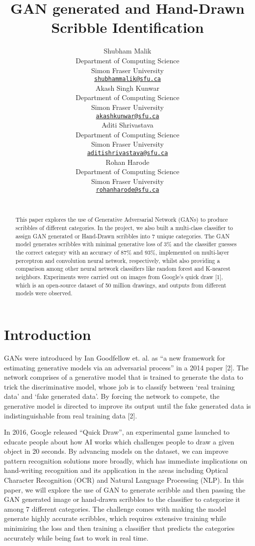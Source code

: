\documentclass{article} %
\title{GAN generated and Hand-Drawn Scribble Identification}
\author{
Shubham Malik\\
Department of Computing Science\\
Simon Fraser University\\
\href{mailto:shubhamm@sfu.ca}{\texttt{shubham\textunderscore malik@sfu.ca}} \\
\And
Akash Singh Kunwar \\
Department of Computing Science\\
Simon Fraser University\\
\href{mailto:akunwar@sfu.ca}{\texttt{akash\textunderscore kunwar@sfu.ca}} \\
\AND
Aditi Shrivastava \\
Department of Computing Science\\
Simon Fraser University\\
\href{mailto:ashrivas@sfu.ca}{\texttt{aditi\textunderscore shrivastava@sfu.ca}}
 \\
\And
Rohan Harode \\
Department of Computing Science\\
Simon Fraser University\\
\href{mailto:rharode@sfu.ca}{\texttt{rohan\textunderscore harode@sfu.ca}}
 \\
\\
}
\begin{document}
\maketitle

\graphicspath{ {./images/} }

%
%

\begin{abstract}
\label{abstract}
This paper explores the use of Generative Adversarial Network (GANs) to produce scribbles of different categories. In the project, we also built a multi-class classifier to assign GAN generated or Hand-Drawn scribbles into 7 unique categories. The GAN model generates scribbles with minimal generative loss of 3\% and the classifier guesses the correct category with an accuracy of 87\% and 93\%, implemented on multi-layer perceptron and convolution neural network, respectively, whilst also providing a comparison among other neural network classifiers like random forest and K-nearest neighbors. Experiments were carried out on images from Google’s quick draw [1], which is an open-source dataset of 50 million drawings, and outputs from different models were observed.
\end{abstract}

%
%


\section{Introduction}
\label{intro}
GANs were introduced by Ian Goodfellow et. al. as “a new framework for estimating generative models via an adversarial process” in a 2014 paper [2]. The network comprises of a generative model that is trained to generate the data to trick the discriminative model, whose job is to classify between ‘real training data’ and ‘fake generated data’. By forcing the network to compete, the generative model is directed to improve its output until the fake generated data is indistinguishable from real training data [2].

In 2016, Google released “Quick Draw”, an experimental game launched to educate people about how AI works which challenges people to draw a given object in 20 seconds. By advancing models on the dataset, we can improve pattern recognition solutions more broadly, which has immediate implications on hand-writing recognition and its application in the areas including Optical Character Recognition (OCR) and Natural Language Processing (NLP).
In this paper, we will explore the use of GAN to generate scribble and then passing the GAN generated image or hand-drawn scribbles to the classifier to categorize it among 7 different categories. The challenge comes with making the model generate highly accurate scribbles, which requires extensive training while minimizing the loss and then training a classifier that predicts the categories accurately while being fast to work in real time.
\end{document}
